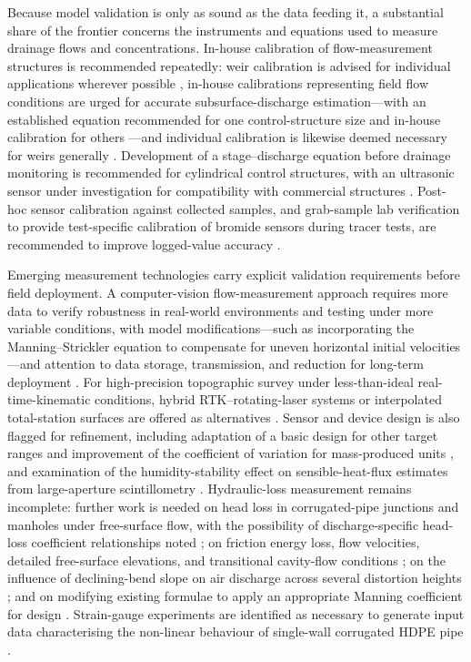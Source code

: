 \documentclass[11pt]{article}
\begin{document}
Because model validation is only as sound as the data feeding it, a substantial share of the frontier concerns the instruments and equations used to measure drainage flows and concentrations. In-house calibration of flow-measurement structures is recommended repeatedly: weir calibration is advised for individual applications wherever possible \parencite{Christianson2019}, in-house calibrations representing field flow conditions are urged for accurate subsurface-discharge estimation---with an established equation recommended for one control-structure size and in-house calibration for others \parencite{Katuwal2024}---and individual calibration is likewise deemed necessary for weirs generally \parencite{Napierala2023}. Development of a stage--discharge equation before drainage monitoring is recommended for cylindrical control structures, with an ultrasonic sensor under investigation for compatibility with commercial structures \parencite{BinShokrana2021}. Post-hoc sensor calibration against collected samples, and grab-sample lab verification to provide test-specific calibration of bromide sensors during tracer tests, are recommended to improve logged-value accuracy \parencite{deOliveira2023b}.

Emerging measurement technologies carry explicit validation requirements before field deployment. A computer-vision flow-measurement approach requires more data to verify robustness in real-world environments and testing under more variable conditions, with model modifications---such as incorporating the Manning--Strickler equation to compensate for uneven horizontal initial velocities---and attention to data storage, transmission, and reduction for long-term deployment \parencite{Young2023}. For high-precision topographic survey under less-than-ideal real-time-kinematic conditions, hybrid RTK--rotating-laser systems or interpolated total-station surfaces are offered as alternatives \parencite{Freeland2014}. Sensor and device design is also flagged for refinement, including adaptation of a basic design for other target ranges and improvement of the coefficient of variation for mass-produced units \parencite{Enamorado2007}, and examination of the humidity-stability effect on sensible-heat-flux estimates from large-aperture scintillometry \parencite{Zhang2010}. Hydraulic-loss measurement remains incomplete: further work is needed on head loss in corrugated-pipe junctions and manholes under free-surface flow, with the possibility of discharge-specific head-loss coefficient relationships noted \parencite{Bayat2011}; on friction energy loss, flow velocities, detailed free-surface elevations, and transitional cavity-flow conditions \parencite{Nédélec2008}; on the influence of declining-bend slope on air discharge across several distortion heights \parencite{Gurklys2008}; and on modifying existing formulae to apply an appropriate Manning coefficient for design \parencite{Kouchakzadeh2011}. Strain-gauge experiments are identified as necessary to generate input data characterising the non-linear behaviour of single-wall corrugated HDPE pipe \parencite{Gaj2021}.
\end{document}
